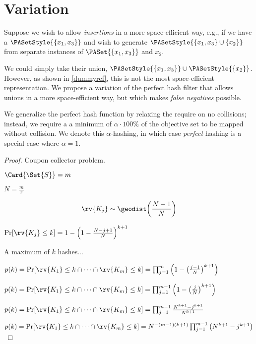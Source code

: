 \section{Variation}

Suppose we wish to allow \emph{insertions} in a more space-efficient way, e.g., if we have a $\PASetStyle{\{x_1,x_3\}}$ and wish to generate $\PASetStyle{\{x_1,x_3\} \cup \{x_2\}}$ from separate instances of $\PASet{\{x_1,x_3\}}$ and $x_2$.



We could simply take their union, $\PASetStyle{\{x_1,x_3\}} \cup \PASetStyle{\{x_2\}}$. 
However, as shown in \cref{dummyref}, this is not the most space-efficient representation. 
We propose a variation of the perfect hash filter that allows unions in a more space-efficient way, but which makes \emph{false negatives} possible.

We generalize the perfect hash function by relaxing the require on no collisions;
instead, we require a a minimum of $\alpha \cdot 100 \%$ of the objective set to be mapped without collision.
We denote this $\alpha$-hashing, in which case \emph{perfect} hashing is a special case where $\alpha=1$.

\begin{proof}
Coupon collector problem.

$\Card{\Set{S}} = m$

$N = \frac{m}{r}$

\begin{equation}
    \rv{K_j} \sim \geodist\!\left(\frac{N-1}{N}\right)
\end{equation}


$\Pr[\rv{K_j} \leq k] = 1 - \left(1 - \frac{N-j+1}{N}\right)^{k+1}$

A maximum of $k$ hashes...

$p(k) = \Pr[\rv{K_1} \leq k \cap \cdots \cap \rv{K_m} \leq k] = \prod_{j=1}^{m}\left(1 - \left(\frac{j-1}{N}\right)^{k+1}\right)$

$p(k) = \Pr[\rv{K_1} \leq k \cap \cdots \cap \rv{K_m} \leq k] = \prod_{j=1}^{m-1}\left(1 - \left(\frac{j}{N}\right)^{k+1}\right)$


$p(k) = \Pr[\rv{K_1} \leq k \cap \cdots \cap \rv{K_m} \leq k] = \prod_{j=1}^{m-1}\frac{N^{k+1} - j^{k+1}}{N^{k+1}}$


$p(k) = \Pr[\rv{K_1} \leq k \cap \cdots \cap \rv{K_m} \leq k] = N^{-(m-1)(k+1)} \prod_{j=1}^{m-1}\left(N^{k+1} - j^{k+1}\right)$


\end{proof}


